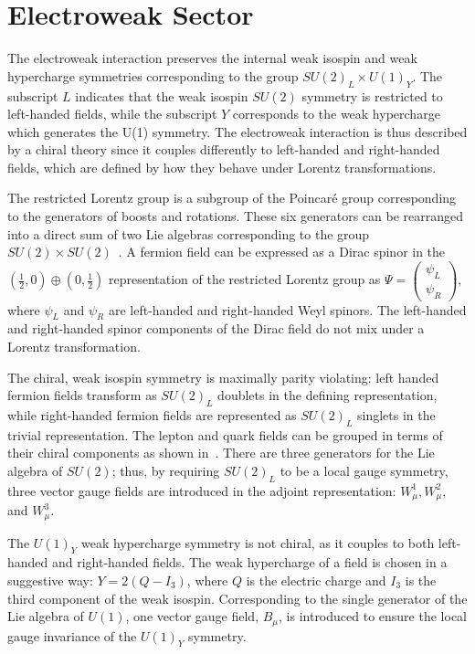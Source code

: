 %
\section{Electroweak Sector}
The electroweak interaction preserves the internal weak isospin and weak hypercharge symmetries corresponding to the group $SU(2)_L\times U(1)_Y$. The subscript $L$ indicates that the weak isospin $SU(2)$ symmetry is restricted to left-handed fields, while the subscript $Y$ corresponds to the weak hypercharge which generates the U(1) symmetry. The electroweak interaction is thus described by a chiral theory since it couples differently to left-handed and right-handed fields, which are defined by how they behave under Lorentz transformations.

The restricted Lorentz group is a subgroup of the Poincar\'e group corresponding to the generators of boosts and rotations. These six generators can be rearranged into a direct sum of two Lie algebras corresponding to the group $SU(2)\times SU(2)$~\cite{Srednicki}. A fermion field can be expressed as a Dirac spinor in the $(\frac{1}{2},0)\oplus(0,\frac{1}{2})$ representation of the restricted Lorentz group as $\Psi = \begin{pmatrix}\psi_L\\\psi_R\end{pmatrix}$, where $\psi_L$ and $\psi_R$ are left-handed and right-handed Weyl spinors. The left-handed and right-handed spinor components of the Dirac field do not mix under a Lorentz transformation.

The chiral, weak isospin symmetry is maximally parity violating: left handed fermion fields transform as $SU(2)_L$ doublets in the defining representation, while right-handed fermion fields are represented as $SU(2)_L$ singlets in the trivial representation. The lepton and quark fields can be grouped in terms of their chiral components as shown in~\Tab{\ref{tab:ew_rep}}.  There are three generators for the Lie algebra of $SU(2)$; thus, by requiring $SU(2)_L$ to be a local gauge symmetry, three vector gauge fields are introduced in the adjoint representation: $W_{\mu}^1,W_{\mu}^2$, and $W_{\mu}^3$. 

The $U(1)_Y$ weak hypercharge symmetry is not chiral, as it couples to both left-handed and right-handed fields. The weak hypercharge of a field is chosen in a suggestive way: $Y=2(Q-I_3)$, where $Q$ is the electric charge and $I_3$ is the third component of the weak isospin. Corresponding to the single generator of the Lie algebra of $U(1)$, one vector gauge field, $B_{\mu}$, is introduced to ensure the local gauge invariance of the $U(1)_Y$ symmetry. 

